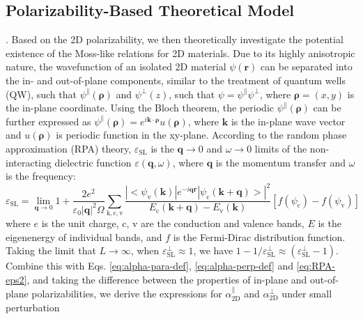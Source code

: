 \documentclass[journal=ancac3,manuscript=article,email=true,hyperref=true,keywords=false]{achemso}
\begin{document}
\iffalse
\subsection{Polarizability-Based Theoretical Model}
.
Based on the 2D polarizability, we
then theoretically investigate the potential existence of the
Moss-like relations for 2D materials.  Due to its highly anisotropic
nature, the wavefunction of an isolated 2D material $\psi(\mathbf{r})$
can be separated into the in- and out-of-plane components, similar to
the treatment of quantum wells (QW),\cite{davies_physics_1997} such
that $\psi^{\parallel}(\boldsymbol{\rho})$ and $\psi^{\perp}(z)$, such
that $\psi=\psi^{\parallel}\psi^{\perp}$, where
$\boldsymbol{\rho}=(x, y)$ is the in-plane coordinate. Using the Bloch
theorem, the periodic $\psi^{\parallel}(\boldsymbol{\rho})$ can be
further expressed as
$\psi^{\parallel}(\boldsymbol{\rho})=e^{i\mathbf{k} \cdot
  \boldsymbol{\rho}}u(\boldsymbol{\rho})$, where $\mathbf{k}$ is the
in-plane wave vector and $u(\boldsymbol{\rho})$ is periodic function
in the xy-plane. According to the random phase approximation (RPA)
theory\cite{Adler_1962}, $\varepsilon_{\mathrm{SL}}$ is the
$\mathbf{q} \to 0$ and $\omega \to 0$ limits of the non-interacting
dielectric function $\varepsilon(\mathbf{q}, \omega)$, where
$\mathbf{q}$ is the momentum transfer and $\omega$ is the frequency:
\begin{equation}
  \label{eq:RPA-eps2}
  \varepsilon_{\mathrm{SL}}
  = \lim_{\mathbf{q} \to 0} 1 + \frac{2e^{2}}{\varepsilon_{0} |\mathbf{q}|^{2} \Omega}
  \sum_{\mathrm{k, c, v}}
  \frac{|<\psi_{\mathrm{v}}(\mathbf{k})|e^{-i\mathbf{q}\mathbf{r}}|\psi_{\mathrm{c}}(\mathbf{k+q})>|^{2}}
  {E_{\mathrm{c}}(\mathbf{k+q}) - E_{\mathrm{v}}(\mathbf{k})}
  \left[f(\psi_{\mathrm{c}}) - f(\psi_{\mathrm{v}})\right]
\end{equation}
where $e$ is the unit charge, c, v are the conduction and valence
bands, $E$ is the eigenenergy of individual bands, and $f$ is the
Fermi-Dirac distribution function. Taking the limit that $L\to\infty$,
when $\varepsilon^{\perp}_{\mathrm{SL}} \approx 1$, we have
$1-1/\varepsilon^{\perp}_{\mathrm{SL}} \approx
(\varepsilon_{\mathrm{SL}}^{\perp} - 1)$. Combine this with
Eqs. \ref{eq:alpha-para-def}, \ref{eq:alpha-perp-def} and
\ref{eq:RPA-eps2}, and taking the difference between the properties of
in-plane and out-of-plane polarizabilities, we derive the expressions
for $\alpha_{\mathrm{2D}}^{\parallel}$ and $\alpha_{\mathrm{2D}}^{\perp}$ under small perturbation
\end{document}
